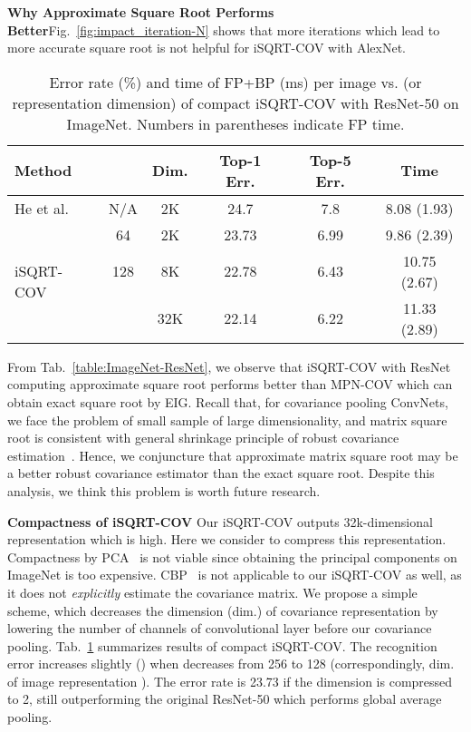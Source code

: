 \documentclass[10pt,twocolumn,letterpaper]{article}
\begin{document}
\vspace{4pt}\noindent\textbf{Why Approximate Square Root Performs Better}\quad  Fig.~\ref{fig:impact_iteration-N} shows that  more iterations which lead to more accurate square root is not helpful for  iSQRT-COV with AlexNet. 
\begin{table}[thb]
\setlength\tabcolsep{4pt}
	\renewcommand{\baselinestretch}{1.05}
\footnotesize
	\centering
\begin{minipage}[t]{1.0\linewidth}
		\centering
		\begin{tabular}{|l|c|c|c|c|c|}
			\hline
			Method  &  & Dim. & Top-1 Err.   &  Top-5 Err. & Time \\
			\hline
			\hline
			He et al.~\cite{He_2016_CVPR}  & N/A & 2K& 24.7 &  7.8 & 8.08 (1.93) \\
			\hline
			\multirow{3}{*}{iSQRT-COV}   & 64 & 2K    & 23.73   & 6.99 &  9.86 (2.39) \\
			&  128 & 8K        & 22.78  & 6.43  & 10.75 (2.67)\\
			&  \;256\; & 32K       & 22.14  & 6.22 & 11.33 (2.89)\\
			\hline
		\end{tabular}
	\end{minipage}
	\renewcommand{\baselinestretch}{1.0}
	\caption{Error rate (\%) and time of FP+BP (ms) per image vs.  (or representation  dimension) of compact  iSQRT-COV with ResNet-50  on ImageNet. Numbers in parentheses indicate FP time.  }
	\label{table:compact-iSQRT-COV}
\end{table}
From Tab.~\ref{table:ImageNet-ResNet}, we observe that iSQRT-COV with ResNet computing approximate square root performs better than MPN-COV which can obtain exact square root by EIG. Recall that, for covariance pooling ConvNets, we face the problem of small sample of large dimensionality,  and matrix square root is consistent with general shrinkage principle of robust covariance estimation~\cite{Li_2017_ICCV}. Hence,  we conjuncture that approximate  matrix square root  may be a better robust covariance estimator than the exact square root. Despite this analysis, we think this  problem is  worth future research.


\vspace{4pt}\noindent\textbf{Compactness of iSQRT-COV}\quad 
Our iSQRT-COV outputs  32k-dimensional  representation which is high. Here we consider to compress this representation. Compactness by PCA~\cite{lin2015bilinear} is not viable since obtaining the principal components on ImageNet is too expensive. CBP~\cite{Gao_2016_CVPR} is not applicable to our iSQRT-COV as well, as it does not \textit{explicitly} estimate the covariance matrix. We propose a simple scheme, which decreases the dimension (dim.)  of covariance representation by lowering the number  of channels of  convolutional layer before our covariance pooling.  
Tab.~\ref{table:compact-iSQRT-COV} summarizes  results of compact iSQRT-COV. The recognition error increases slightly  () when  decreases from 256 to 128 (correspondingly, dim. of image representation ). The error rate is 23.73 if the dimension is compressed to 2, still outperforming the original ResNet-50 which performs global average pooling. 
\end{document}
